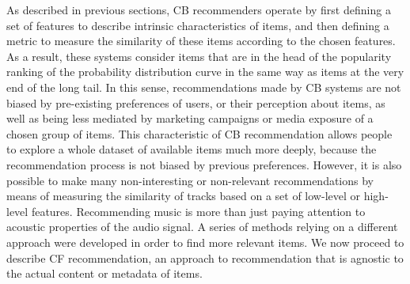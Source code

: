 As described in previous sections, CB recommenders operate by first defining a set of features to describe intrinsic characteristics of items, and then defining a metric to measure the similarity of these items according to the chosen features.
As a result, these systems consider items that are in the head of the popularity ranking of the probability distribution curve in the same way as items at the very end of the long tail. 
In this sense, recommendations made by CB systems are not biased by pre-existing preferences of users, or their perception about items, as well as being less mediated by marketing campaigns or media exposure of a chosen group of items. 
This characteristic of CB recommendation allows people to explore a whole dataset of available items much more deeply, because the recommendation process is not biased by previous preferences.
However, it is also possible to make many non-interesting or non-relevant recommendations by means of measuring the similarity of tracks based on a set of low-level or high-level features. Recommending music is more than just paying attention to acoustic properties of the audio signal. 
A series of methods relying on a different approach were developed in order to find more relevant items. We now proceed to describe CF recommendation, an approach to recommendation that is agnostic to the actual content or metadata of items. 











